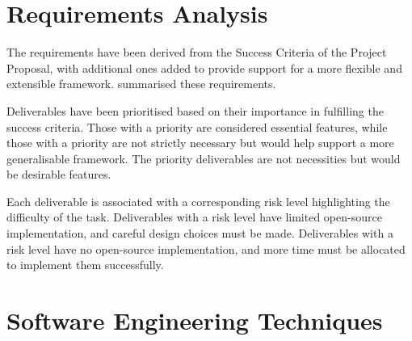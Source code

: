 \section{Requirements Analysis}
The requirements have been derived from the Success Criteria of the Project Proposal, with additional ones added to provide support for a more flexible and extensible framework.  summarised these requirements.


Deliverables have been prioritised based on their importance in fulfilling the success criteria. Those with a {} priority are considered essential features, while those with a {} priority are not strictly necessary but would help support a more generalisable framework. The {} priority deliverables are not necessities but would be desirable features.

Each deliverable is associated with a corresponding risk level highlighting the difficulty of the task. Deliverables with a {} risk level have limited open-source implementation, and careful design choices must be made. Deliverables with a {} risk level have no open-source implementation, and more time must be allocated to implement them successfully.

\section{Software Engineering Techniques}
